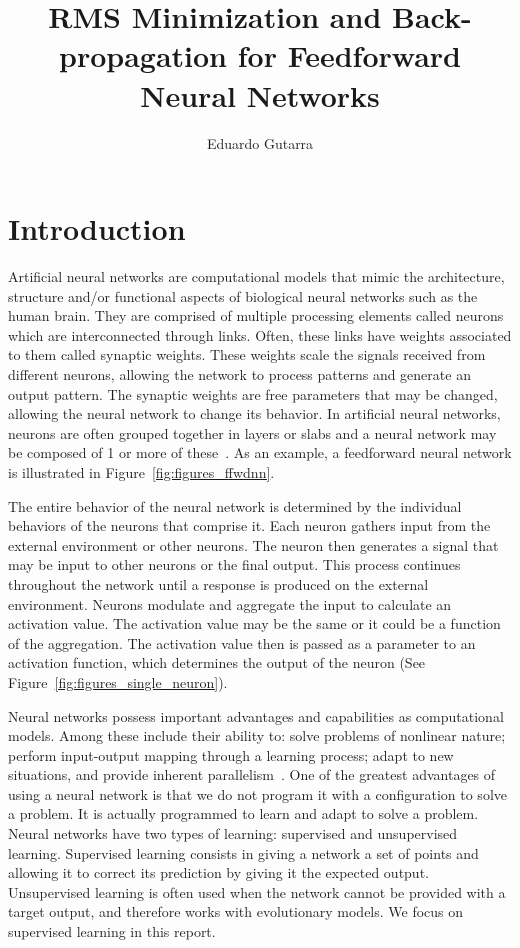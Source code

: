 \documentclass[11pt]{article}
\title{RMS Minimization and Back-propagation for Feedforward Neural Networks}
\author{Eduardo Gutarra}
\begin{document}
	
\ifpdf
{}
\else
{}
\fi
	
\maketitle
	
\section{Introduction} %
\label{sec:introduction}

Artificial neural networks are computational models that mimic the architecture, structure and/or functional aspects of biological
neural networks such as the human brain. They are comprised of multiple processing elements called neurons which are interconnected
through links. Often, these links have weights associated to them called synaptic weights. These weights scale the signals received from
different neurons, allowing the network to process patterns and generate an output pattern. The synaptic weights are free parameters
that may be changed, allowing the neural network to change its behavior. In artificial neural networks, neurons are often grouped
together in layers or slabs and a neural network may be composed of 1 or more of these~\cite{skapura}. As an example, a feedforward
neural network is illustrated in Figure~\ref{fig:figures_ffwdnn}.

The entire behavior of the neural network is determined by the individual behaviors of the neurons that comprise it. Each neuron gathers
input from the external environment or other neurons. The neuron then generates a signal that may be input to other neurons or the final
output. This process continues throughout the network until a response is produced on the external environment. Neurons modulate and
aggregate the input to calculate an activation value. The activation value may be the same or it could be a function of the aggregation.
The activation value then is passed as a parameter to an activation function, which determines the output of the neuron (See
Figure~\ref{fig:figures_single_neuron}).

Neural networks possess important advantages and capabilities as computational models. Among these include their ability to: solve
problems of nonlinear nature; perform input-output mapping through a learning process; adapt to new situations, and provide inherent
parallelism~\cite{Haykin:1994:NNC:541500}. One of the greatest advantages of using a neural network is that we do not program it with a
configuration to solve a problem. It is actually programmed to learn and adapt to solve a problem. Neural networks have two types of
learning: supervised and unsupervised learning. Supervised learning consists in giving a network a set of points and allowing it to
correct its prediction by giving it the expected output. Unsupervised learning is often used when the network cannot be provided with a
target output, and therefore works with evolutionary models. We focus on supervised learning in this report.
\end{document}
